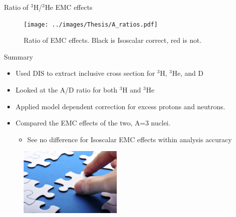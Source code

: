 \documentclass[12pt,usenames,dvipsnames]{beamer}
\begin{document}
\begin{frame}{Ratio of $^3$H/$^3$He EMC effects}
\vspace{-20pt}
\begin{figure}
	\texttt{[image: ../images/Thesis/A\_ratios.pdf]}
	\caption*{Ratio of EMC effects. Black is Isoscalar correct, red is not. }
\end{figure}
\end{frame}



\begin{frame}{}
\begin{block}{Summary}
	\begin{itemize}
		\item Used DIS to extract inclusive cross section for $^3$H, $^3$He, and D
		\item Looked at the A/D ratio for both $^3$H and $^3$He
		\item Applied model dependent correction for excess protons and neutrons.
		\item Compared the EMC effects of the two, A=3 nuclei. 
		\begin{itemize}
			\item See no difference for Isoscalar EMC effects within analysis accuracy
		\end{itemize}
	\end{itemize}
\centering
\end{block}

\begin{figure}
	\includegraphics[width =5cm]{../images/puzzle2.png}
\end{figure}

\end{frame}


\end{document}
